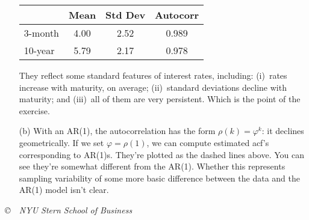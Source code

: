 \documentclass[11pt]{exam}
\begin{document}
\begin{questions}
\begin{solution}
\begin{enumerate}
\begin{center}
\begin{tabular}{lccc}
\toprule
        &  Mean & Std Dev & Autocorr \\
\midrule
3-month  &   4.00 & 2.52 & 0.989  \\
10-year  &   5.79 & 2.17 & 0.978  \\
\bottomrule
\end{tabular}
\end{center}

They reflect some standard features of interest rates, including:
(i)~rates increase with maturity, on average;
(ii)~standard deviations decline with maturity;
and (iii)~all of them are very persistent.
Which is the point of the exercise.


\item[(b)] With an AR(1), the autocorrelation has the form
$\rho(k) = \varphi^k$:  it declines geometrically.
If we set $\varphi = \rho(1)$, we can compute
estimated acf's corresponding to AR(1)s.
They're plotted as the dashed lines above.
You can see they're somewhat different from the AR(1).
Whether this represents sampling variability of some more
basic difference between the data and the AR(1) model isn't clear.
\end{enumerate}
\end{solution}

\end{questions}

\vfill \centerline{\it \copyright \ \number\year \
NYU Stern School of Business}
\end{document}
